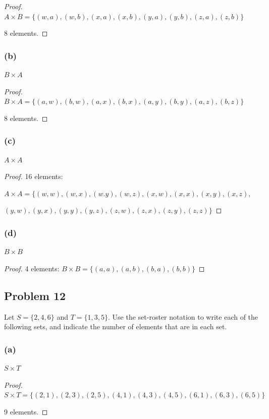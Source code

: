 \documentclass[14pt]{extarticle}
\begin{document}
\begin{proof}
    $A \times B = \{(w, a), (w, b), (x, a), (x, b), (y, a), (y, b), (z, a), (z, b)\}$

    8 elements.
\end{proof}

\subsubsection{(b)}
$B \times A$

\begin{proof}
    $B \times A = \{(a, w), (b, w), (a, x), (b, x), (a, y), (b, y), (a, z), (b, z)\}$

    8 elements.
\end{proof}

\subsubsection{(c)}
$A \times A$

\begin{proof}
    16 elements:

    $A \times A = \{(w, w), (w, x), (w. y), (w, z), (x, w), (x, x), (x, y), (x, z),$

    $(y, w), (y, x), (y, y), (y, z), (z, w), (z, x), (z, y), (z, z)\}$
\end{proof}

\subsubsection{(d)}
$B \times B$

\begin{proof}
    4 elements: $B \times B = \{(a, a), (a, b), (b, a), (b, b)\}$
\end{proof}

\subsection{Problem 12}
Let $S = \{2, 4, 6\}$ and $T = \{1, 3, 5\}$. Use the set-roster notation to
write each of the following sets, and indicate the number of elements that are
in each set.

\subsubsection{(a)}
$S \times T$

\begin{proof}
    $S \times T = \{(2, 1), (2, 3), (2, 5), (4, 1), (4, 3), (4, 5), (6, 1), (6, 3),
        (6, 5)\}$

    9 elements.
\end{proof}
\end{document}

